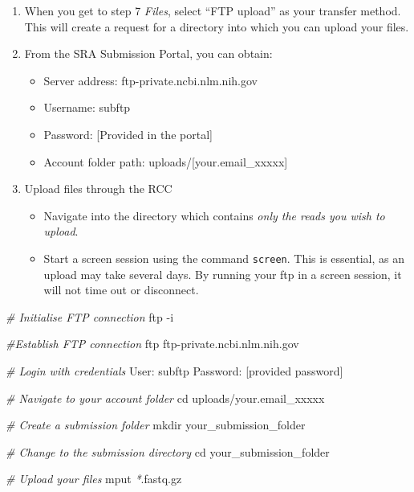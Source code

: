 \documentclass[
]{article}
\newenvironment{Shaded}{\begin{snugshade}}{\end{snugshade}}
\newcommand{\AttributeTok}[1]{\textcolor[rgb]{0.77,0.63,0.00}{#1}}
\newcommand{\BuiltInTok}[1]{#1}
\newcommand{\CommentTok}[1]{\textcolor[rgb]{0.56,0.35,0.01}{\textit{#1}}}
\newcommand{\ExtensionTok}[1]{#1}
\newcommand{\FunctionTok}[1]{\textcolor[rgb]{0.00,0.00,0.00}{#1}}
\newcommand{\NormalTok}[1]{#1}
\newcommand{\PreprocessorTok}[1]{\textcolor[rgb]{0.56,0.35,0.01}{\textit{#1}}}
\begin{document}
\begin{enumerate}
\def\labelenumi{\arabic{enumi}.}
\item
  When you get to step 7 \emph{Files}, select ``FTP upload'' as your
  transfer method. This will create a request for a directory into which
  you can upload your files.
\item
  From the SRA Submission Portal, you can obtain:

  \begin{itemize}
  \item
    Server address: ftp-private.ncbi.nlm.nih.gov
  \item
    Username: subftp
  \item
    Password: {[}Provided in the portal{]}
  \item
    Account folder path: uploads/{[}your.email\_xxxxx{]}
  \end{itemize}
\item
  Upload files through the RCC

  \begin{itemize}
  \item
    Navigate into the directory which contains \emph{only the reads you
    wish to upload}.
  \item
    Start a screen session using the command \texttt{screen}. This is
    essential, as an upload may take several days. By running your ftp
    in a screen session, it will not time out or disconnect.
  \end{itemize}
\end{enumerate}

\begin{Shaded}
\begin{Highlighting}[]
\CommentTok{\# Initialise FTP connection}
\FunctionTok{ftp} \AttributeTok{{-}i}

\CommentTok{\#Establish FTP connection}
\FunctionTok{ftp}\NormalTok{ ftp{-}private.ncbi.nlm.nih.gov}

\CommentTok{\# Login with credentials }
\ExtensionTok{User:}\NormalTok{ subftp}
\ExtensionTok{Password:}\NormalTok{ [provided password]}

\CommentTok{\# Navigate to your account folder}
\BuiltInTok{cd}\NormalTok{ uploads/your.email\_xxxxx}

\CommentTok{\# Create a submission folder}
\FunctionTok{mkdir}\NormalTok{ your\_submission\_folder}

\CommentTok{\# Change to the submission directory}
\BuiltInTok{cd}\NormalTok{ your\_submission\_folder}

\CommentTok{\# Upload your files}
\ExtensionTok{mput} \PreprocessorTok{*}\NormalTok{.fastq.gz}
\end{Highlighting}
\end{Shaded}
\end{document}
